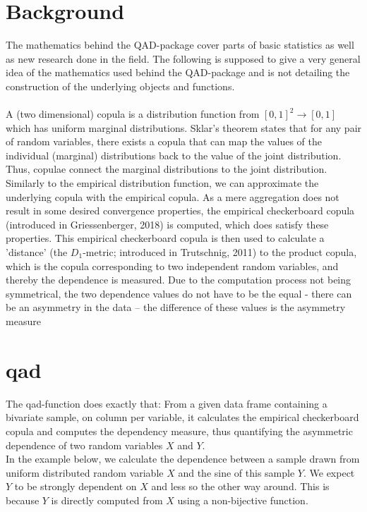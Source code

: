 \documentclass{scrartcl}\usepackage[]{graphicx}\usepackage[]{color}
\begin{document}
\section{Background}
The mathematics behind the QAD-package cover parts of basic statistics as well as new research done in the field. The following is supposed to give a very general idea of the mathematics used behind the QAD-package and is not detailing the construction of the underlying objects and functions.\\\\
A (two dimensional) copula is a distribution function from $[0,1]^2 \to [0,1]$ which has uniform marginal distributions. Sklar's theorem states that for any pair of random variables, there exists a copula that can map the values of the individual (marginal) distributions back to the value of the joint distribution. Thus, copulae connect the marginal distributions to the joint distribution. 
Similarly to the empirical distribution function, we can approximate the underlying copula with the empirical copula. As a mere aggregation does not result in some desired convergence properties, the empirical checkerboard copula (introduced in Griessenberger, 2018) is computed, which does satisfy these properties. 
This empirical checkerboard copula is then used to calculate a 'distance' (the $D_1$-metric; introduced in Trutschnig, 2011) to the product copula, which is the copula corresponding to two independent random variables, and thereby the dependence is measured.
Due to the computation process not being symmetrical, the two dependence values do not have to be the equal - there can be an asymmetry in the data -- the difference of these values is the asymmetry measure

\section{qad}

The qad-function does exactly that: From a given data frame containing a bivariate sample, on column per variable, it calculates the empirical checkerboard copula and computes the dependency measure, thus quantifying the asymmetric dependence of two random variables $X$ and $Y$.\\
In the example below, we calculate the dependence between a sample drawn from uniform distributed random variable $X$ and the sine of this sample $Y$. We expect $Y$ to be strongly dependent on $X$ and less so the other way around. This is because $Y$ is directly computed from $X$ using a non-bijective function.
\end{document}
